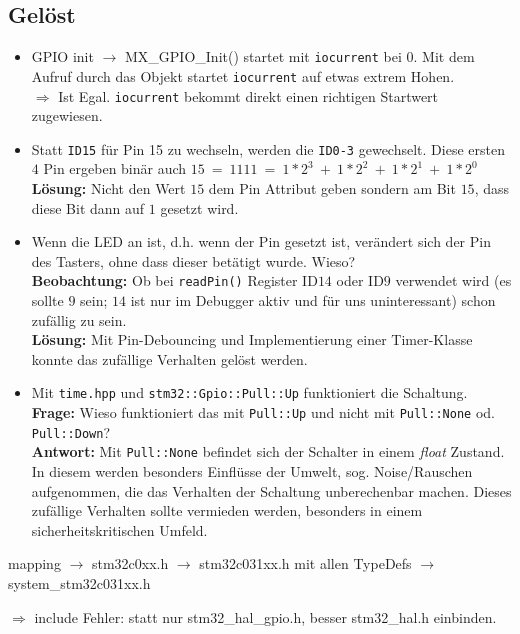 \subsection*{Gelöst}
\begin{itemize}
	\item GPIO init $\rightarrow$ MX\_GPIO\_Init() startet mit \texttt{iocurrent} bei $0$. Mit dem Aufruf durch das Objekt startet \texttt{iocurrent} auf etwas extrem Hohen. \\ $\Longrightarrow$ Ist Egal. \texttt{iocurrent} bekommt direkt einen richtigen Startwert zugewiesen.
	\item Statt \texttt{ID15} für Pin 15 zu wechseln, werden die \texttt{ID0-3} gewechselt. Diese ersten $4$ Pin ergeben binär auch $15\ =\ 1111\ =\ 1*2^3\ +\ 1*2^2\ +\ 1*2^1\ +\ 1*2^0$ \\ \textbf{Lösung:} Nicht den Wert $15$ dem Pin Attribut geben sondern am Bit $15$, dass diese Bit dann auf $1$ gesetzt wird.
	\item Wenn die LED an ist, d.h. wenn der Pin gesetzt ist, verändert sich der Pin des Tasters, ohne dass dieser betätigt wurde. Wieso?\\ \textbf{Beobachtung:} Ob bei \texttt{readPin()} Register ID$14$ oder ID$9$ verwendet wird (es sollte $9$ sein; $14$ ist nur im Debugger aktiv und für uns uninteressant) schon zufällig zu sein.\\ \textbf{Lösung:} Mit Pin-Debouncing und Implementierung einer Timer-Klasse konnte das zufällige Verhalten gelöst werden. 
	\item Mit \texttt{time.hpp} und \texttt{stm32::Gpio::Pull::Up} funktioniert die Schaltung.\\ \textbf{Frage:} Wieso funktioniert das mit \texttt{Pull::Up} und nicht mit \texttt{Pull::None} od. \texttt{Pull::Down}?\\ \textbf{Antwort:} Mit \texttt{Pull::None} befindet sich der Schalter in einem \emph{float} Zustand. In diesem werden besonders Einflüsse der Umwelt, sog. Noise/Rauschen aufgenommen, die das Verhalten der Schaltung unberechenbar machen. Dieses zufällige Verhalten sollte vermieden werden, besonders in einem sicherheitskritischen Umfeld.
\end{itemize}

\vspace{3mm}

mapping $\rightarrow$ stm32c0xx.h $\rightarrow$ stm32c031xx.h mit allen TypeDefs $\rightarrow$ system\_stm32c031xx.h

$\Longrightarrow$ include Fehler: statt nur stm32\_hal\_gpio.h, besser stm32\_hal.h einbinden.
\\

